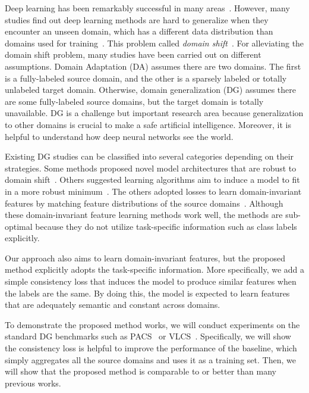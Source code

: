 Deep learning has been remarkably successful in many areas~\cite{Girshick2014, Krizhevsky2012, Ren2017, Shelhamer2017}. However, many studies find out deep learning methods are hard to generalize when they encounter an unseen domain, which has a different data distribution than domains used for training~\cite{Li2018MLDG, Li2017dg, Li2018MLDG, shankar2018generalizing, ganin2015unsupervised, bousmalis2016domain, motiian2017CCSA}. This problem called \textit{domain shift}~\cite{Shimodaira2000}. For alleviating the domain shift problem, many studies have been carried out on different assumptions. Domain Adaptation (DA) assumes there are two domains. The first is a fully-labeled source domain, and the other is a sparsely labeled or totally unlabeled target domain. Otherwise, domain generalization (DG) assumes there are some fully-labeled source domains, but the target domain is totally unavailable. DG is a challenge but important research area because generalization to other domains is crucial to make a safe artificial intelligence. Moreover, it is helpful to understand how deep neural networks see the world.

Existing DG studies can be classified into several categories depending on their strategies. Some methods proposed novel model architectures that are robust to domain shift~\cite{Khosla12undobias, Li2017dg}. Others suggested learning algorithms aim to induce a model to fit in a more robust minimum~\cite{li2019episodic, Li2018MLDG, NIPS2018_metareg}. The others adopted losses to learn domain-invariant features by matching feature distributions of the source domains~\cite{Ghifary2015mtae, muandet2013domaingeneralization, mmdaaecvpr2018}. Although these domain-invariant feature learning methods work well, the methods are sub-optimal because they do not utilize task-specific information such as class labels explicitly. 

Our approach also aims to learn domain-invariant features, but the proposed method explicitly adopts the task-specific information. More specifically, we add a simple consistency loss that induces the model to produce similar features when the labels are the same. By doing this, the model is expected to learn features that are adequately semantic and constant across domains.

To demonstrate the proposed method works, we will conduct experiments on the standard DG benchmarks such as PACS~\cite{Li2017dg} or VLCS~\cite{chen2013vlcs}. Specifically, we will show the consistency loss is helpful to improve the performance of the baseline, which simply aggregates all the source domains and uses it as a training set. Then, we will show that the proposed method is comparable to or better than many previous works.

